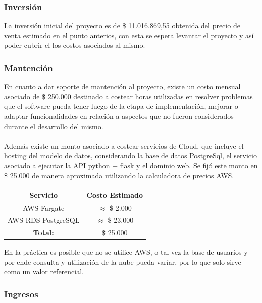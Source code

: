 \documentclass[12pt]{article}
\begin{document}
\subsubsection{Inversión}

La inversión inicial del proyecto es de \$ 11.016.869,55 obtenida del precio de venta estimado en el punto anterios, con esta se espera levantar el proyecto y así poder cubrir el los costos asociados al mismo.

\subsubsection{Mantención}

En cuanto a dar soporte de mantención al proyecto, existe un costo mensual asociado de \$ 250.000 destinado a costear horas utilizadas en resolver problemas que el software pueda tener luego de la etapa de implementación, mejorar o adaptar funcionalidades en relación a aspectos que no fueron considerados durante el desarrollo del mismo.
\\\\
Además existe un monto asociado a costear servicios de Cloud, que incluye el hosting del modelo de datos, considerando la base de datos PostgreSql, el servicio asociado a ejecutar la API python + flask y el dominio web. Se fijó este monto en \$ 25.000 de manera aproximada utilizando la calculadora de precios AWS.
\begin{table}[!h]
    \centering
    \begin{tabular}{|c|c|}
        \hline
         \textbf{Servicio} & \textbf{Costo Estimado} \\
         \hline
         AWS Fargate & $\approx$ \$ 2.000 \\
         AWS RDS PostgreSQL & $\approx$ \$ 23.000 \\
         \hline
         \textbf{Total:} & \$ 25.000 \\
         \hline
    \end{tabular}
\end{table}
En la práctica es posible que no se utilice AWS, o tal vez la base de usuarios y por ende consulta y utilización de la nube pueda varíar, por lo que solo sirve como un valor referencial.
\subsubsection{Ingresos}
\end{document}
